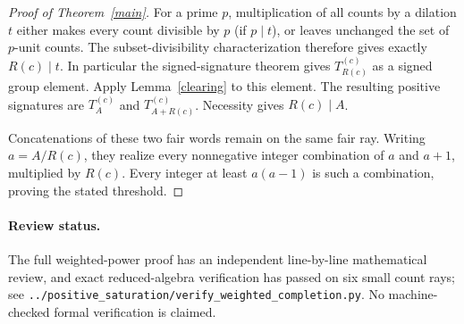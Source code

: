 \documentclass[11pt]{article}
\begin{document}
\begin{proof}[Proof of Theorem~\ref{main}]
For a prime $p$, multiplication of all counts by a dilation $t$ either
makes every count divisible by $p$ (if $p\mid t$), or leaves unchanged
the set of $p$-unit counts. The subset-divisibility characterization
therefore gives exactly $R(c)\mid t$. In particular the signed-signature
theorem gives $T_{R(c)}^{(c)}$ as a signed group element.
Apply Lemma~\ref{clearing} to this element. The resulting positive
signatures are $T_A^{(c)}$ and $T_{A+R(c)}^{(c)}$.
Necessity gives $R(c)\mid A$.

Concatenations of these two fair words remain on the same fair ray.
Writing $a=A/R(c)$, they realize every nonnegative integer combination
of $a$ and $a+1$, multiplied by $R(c)$. Every integer at least
$a(a-1)$ is such a combination, proving the stated threshold.
\end{proof}

\paragraph{Review status.}
The full weighted-power proof has an independent line-by-line
mathematical review, and exact reduced-algebra verification has passed
on six small count rays; see
\texttt{../positive\_saturation/verify\_weighted\_completion.py}.
No machine-checked formal verification is claimed.
\end{document}
